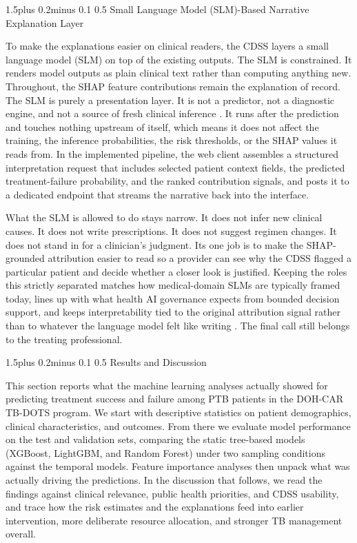 \documentclass[12pt]{article}
\makeatletter
\renewcommand{\_}{\textunderscore\allowbreak}
\renewcommand{\section}{\@startsection{section}{1}{0pt}%
  {1.5\baselineskip plus 0.2\baselineskip minus 0.1\baselineskip}%
  {0.5\baselineskip}%
  {\centering\bfseries\normalsize}}
\renewcommand{\subsection}{\@startsection{subsection}{2}{0pt}%
  {1.5\baselineskip plus 0.2\baselineskip minus 0.1\baselineskip}%
  {0.5\baselineskip}%
  {\bfseries\normalsize}}
\makeatother
\begin{document}
\subsection{Small Language Model (SLM)-Based Narrative Explanation Layer}

To make the explanations easier on clinical readers, the CDSS layers a small language model (SLM) on top of the existing outputs. The SLM is constrained. It renders model outputs as plain clinical text rather than computing anything new. Throughout, the SHAP feature contributions remain the explanation of record. The SLM is purely a presentation layer. It is not a predictor, not a diagnostic engine, and not a source of fresh clinical inference \citep{ref39, ref41}. It runs after the prediction and touches nothing upstream of itself, which means it does not affect the training, the inference probabilities, the risk thresholds, or the SHAP values it reads from. In the implemented pipeline, the web client assembles a structured interpretation request that includes selected patient context fields, the predicted treatment-failure probability, and the ranked contribution signals, and posts it to a dedicated endpoint that streams the narrative back into the interface.

What the SLM is allowed to do stays narrow. It does not infer new clinical causes. It does not write prescriptions. It does not suggest regimen changes. It does not stand in for a clinician's judgment. Its one job is to make the SHAP-grounded attribution easier to read so a provider can see why the CDSS flagged a particular patient and decide whether a closer look is justified. Keeping the roles this strictly separated matches how medical-domain SLMs are typically framed today, lines up with what health AI governance expects from bounded decision support, and keeps interpretability tied to the original attribution signal rather than to whatever the language model felt like writing \citep{ref40, ref42, ref44}. The final call still belongs to the treating professional.

\FloatBarrier
\section{Results and Discussion}

This section reports what the machine learning analyses actually showed for predicting treatment success and failure among PTB patients in the DOH-CAR TB-DOTS program. We start with descriptive statistics on patient demographics, clinical characteristics, and outcomes. From there we evaluate model performance on the test and validation sets, comparing the static tree-based models (XGBoost, LightGBM, and Random Forest) under two sampling conditions against the temporal models. Feature importance analyses then unpack what was actually driving the predictions. In the discussion that follows, we read the findings against clinical relevance, public health priorities, and CDSS usability, and trace how the risk estimates and the explanations feed into earlier intervention, more deliberate resource allocation, and stronger TB management overall.
\end{document}
